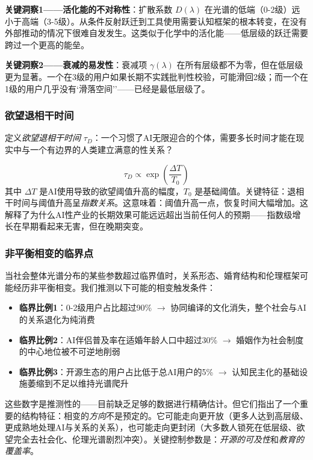 \documentclass[12pt,a4paper]{ctexart}
\begin{document}
\textbf{关键洞察1——活化能的不对称性}：扩散系数 $D(\lambda)$ 在光谱的低端（0-2级）远小于高端（3-5级）。从条件反射跃迁到工具使用需要认知框架的根本转变，在没有外部推动的情况下很难自发发生。这类似于化学中的活化能——低层级的跃迁需要跨过一个更高的能垒。

\textbf{关键洞察2——衰减的易发性}：衰减项 $\gamma(\lambda)$ 在所有层级都不为零，但在低层级更为显著。一个在3级的用户如果长期不实践批判性校验，可能滑回2级；而一个在1级的用户几乎没有`滑落空间''——已经是最低层级了。

\subsubsection{欲望退相干时间}

定义\emph{欲望退相干时间} $\tau_D$：一个习惯了AI无限迎合的个体，需要多长时间才能在现实中与一个有边界的人类建立满意的性关系？

\begin{equation}
\tau_D \propto \exp\left(\frac{\Delta T}{T_0}\right)
\end{equation}
其中 $\Delta T$ 是AI使用导致的欲望阈值升高的幅度，$T_0$ 是基础阈值。关键特征：退相干时间与阈值升高呈\textit{指数关系}。这意味着：阈值升高一点，恢复时间大幅增加。这解释了为什么AI性产业的长期效果可能远远超出当前任何人的预期——指数级增长在早期看起来无害，但在晚期突变。

\subsubsection{非平衡相变的临界点}

当社会整体光谱分布的某些参数超过临界值时，关系形态、婚育结构和伦理框架可能经历非平衡相变。我们推测以下可能的相变触发条件：

\begin{itemize}
\item \textbf{临界比例1}：0-2级用户占比超过90\% $\rightarrow$ 协同编译的文化消失，整个社会与AI的关系退化为纯消费
\item \textbf{临界比例2}：AI伴侣普及率在适婚年龄人口中超过30\% $\rightarrow$ 婚姻作为社会制度的中心地位被不可逆地削弱
\item \textbf{临界比例3}：开源生态的用户占比低于总AI用户的5\% $\rightarrow$ 认知民主化的基础设施萎缩到不足以维持光谱爬升
\end{itemize}

这些数字是推测性的——目前缺乏足够的数据进行精确估计。但它们指出了一个重要的结构特征：相变的\textit{方向}不是预定的。它可能走向更开放（更多人达到高层级、更成熟地处理AI与关系的关系），也可能走向更封闭（大多数人锁死在低层级、欲望完全去社会化、伦理光谱剧烈冲突）。关键控制参数是：\textit{开源的可及性}和\textit{教育的覆盖率}。
\end{document}
